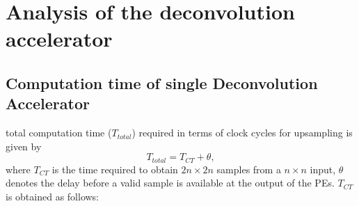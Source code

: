 \documentclass[journal]{IEEEtran}
\begin{document}
\section{Analysis of the deconvolution accelerator}
\label{sec:Analysis of the deconvolution accelerator}
\subsection{Computation time of single Deconvolution Accelerator}\label{sec:Computation time}%
 total computation time ($T_{total}$) required in terms of clock cycles for upsampling is given by
\begin{equation}
T_{total}= T_{CT}+\theta ,
\end{equation}
where $T_{CT}$ is the time required to obtain $2n\times 2n$ samples from a $n\times n$ input, $\theta$ denotes the delay before a valid sample is available at the output of the PEs. $T_{CT}$ is obtained as follows:
\end{document}

